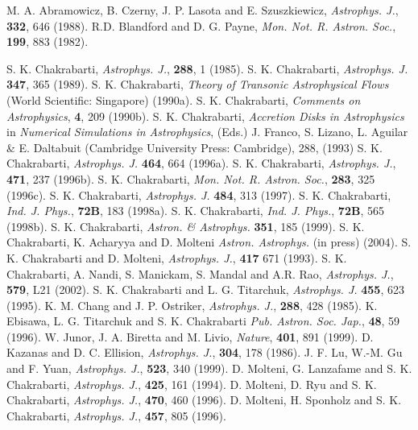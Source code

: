 \documentclass{ws-procs975x65}
\begin{document}
\begin{thebibliography}{0}


\bibitem{} M. A. Abramowicz, B. Czerny, J. P. Lasota and E. Szuszkiewicz, {\it Astrophys. J.}, {\bf 332}, 646 (1988).
\bibitem{} R.D. Blandford and D. G. Payne, {\it Mon. Not. R. Astron. Soc.}, {\bf 199}, 883 (1982).

\bibitem{} S. K. Chakrabarti, {\it Astrophys. J.}, {\bf  288}, 1 (1985). 
\bibitem{} S. K. Chakrabarti, {\it Astrophys. J.} {\bf 347}, 365 (1989).
\bibitem{} S. K. Chakrabarti, {\it Theory of Transonic Astrophysical Flows} (World Scientific: Singapore) (1990a).
\bibitem{} S. K. Chakrabarti, {\it Comments on Astrophysics}, {\bf 4}, 209 (1990b).
\bibitem{} S. K. Chakrabarti, {\it  Accretion Disks in Astrophysics} in {\it Numerical Simulations in Astrophysics}, 
(Eds.) J. Franco, S. Lizano, L. Aguilar \& E. Daltabuit (Cambridge University Press: Cambridge), 288, (1993)
\bibitem{} S. K. Chakrabarti, {\it Astrophys. J.} {\bf 464}, 664 (1996a).
\bibitem{} S. K. Chakrabarti, {\it Astrophys. J.}, {\bf 471}, 237 (1996b).
\bibitem{} S. K. Chakrabarti, {\it Mon. Not. R. Astron. Soc.}, {\bf 283}, 325 (1996c).
\bibitem{} S. K. Chakrabarti, {\it Astrophys. J.} {\bf 484}, 313 (1997).
\bibitem{} S. K. Chakrabarti, {\it Ind. J. Phys.}, {\bf 72B}, 183 (1998a).
\bibitem{} S. K. Chakrabarti, {\it Ind. J. Phys.}, {\bf 72B}, 565 (1998b).
\bibitem{} S. K. Chakrabarti, {\it Astron. \& Astrophys.} {\bf 351}, 185 (1999).
\bibitem{} S. K. Chakrabarti, K. Acharyya and D. Molteni {\it Astron. Astrophys.} (in press) (2004).
\bibitem{} S. K. Chakrabarti and D. Molteni, {\it Astrophys. J.}, {\bf  417} 671 (1993).
\bibitem{} S. K. Chakrabarti, A. Nandi, S. Manickam, S. Mandal and A.R. Rao, {\it Astrophys. J.}, {\bf 579}, L21 (2002).
\bibitem{} S. K.  Chakrabarti  and  L. G. Titarchuk, {\it Astrophys. J.} {\bf 455}, 623 (1995).
\bibitem{} K. M. Chang and J. P. Ostriker, {\it Astrophys. J.}, {\bf 288}, 428 (1985).
\bibitem{} K. Ebisawa, L. G. Titarchuk and S. K. Chakrabarti {\it Pub. Astron. Soc. Jap.}, {\bf 48}, 59 (1996).
\bibitem{} W. Junor, J. A. Biretta and M. Livio, {\it Nature}, {\bf 401}, 891 (1999).
\bibitem{} D. Kazanas and D. C. Ellision, {\it Astrophys. J.}, {\bf 304}, 178 (1986).
\bibitem{} J. F. Lu, W.-M. Gu and F. Yuan, {\it  Astrophys. J.}, {\bf  523}, 340 (1999).
\bibitem{} D. Molteni, G. Lanzafame and S. K. Chakrabarti,  {\it Astrophys. J.}, {\bf 425}, 161 (1994).
\bibitem{} D. Molteni, D. Ryu and  S. K. Chakrabarti, {\it Astrophys. J.}, {\bf 470}, 460 (1996).
\bibitem{} D. Molteni, H. Sponholz and  S. K. Chakrabarti, {\it Astrophys. J.}, {\bf 457}, 805 (1996).

\end{thebibliography}
\end{document}
